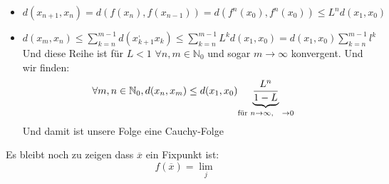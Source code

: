 \documentclass{article}
\newcommand{\mspc}{\hspace{0.3cm}}
\begin{document}
\begin{itemize}
  \item{$d(x_{n+1},x_n)=d(f(x_n),f(x_{n-1}))=d(f^n(x_0),f^n(x_0))\le L^nd(x_1,x_0)$}
  \item{$d(x_m,x_n)\le \sum_{k=n}^{m-1}d(x_{k+1}^,x_k)\le\sum_{k=n}^{m-1}L^kd(x_1,x_0)=d(x_1,x_0)\sum_{k=n}^{m-1}l^k$ Und diese Reihe ist für $L<1$ $\forall n,m\in \mathbb{N}_0$ und sogar $m\rightarrow\infty$ konvergent.
  Und wir finden:\[\forall m,n\in\mathbb{N}_0, d(x_n,x_m)\le d(x_1,x_0)\underset{\text{für }n\rightarrow\infty,\mspc \rightarrow0}{\underbrace{\frac{L^n}{1-L}}} \]Und damit ist unsere Folge eine Cauchy-Folge }
\end{itemize}
Es bleibt noch zu zeigen dass $\overline{x}$ ein Fixpunkt ist:
\[f(\overline{x})=\lim_j\]
\end{document}

